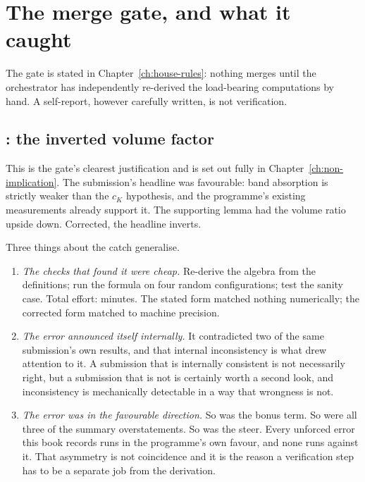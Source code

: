 \section{The merge gate, and what it caught}
\label{sec:gate-record}

The gate is stated in Chapter~\ref{ch:house-rules}: nothing merges until the
orchestrator has independently re-derived the load-bearing computations by
hand. A self-report, however carefully written, is not verification.

\subsection{\texorpdfstring{: the inverted volume factor}{S44: the inverted volume factor}}

This is the gate's clearest justification and is set out fully in
Chapter~\ref{ch:non-implication}. The submission's headline was favourable:
band absorption is strictly weaker than the \(c_K\) hypothesis, and the
programme's existing measurements already support it. The supporting lemma had
the volume ratio upside down. Corrected, the headline inverts.

Three things about the catch generalise.

\begin{enumerate}[leftmargin=2.2em]
\item \emph{The checks that found it were cheap.} Re-derive the algebra from
  the definitions; run the formula on four random configurations; test the
  sanity case. Total effort: minutes. The stated form matched nothing
  numerically; the corrected form matched to machine precision.
\item \emph{The error announced itself internally.} It contradicted two of the
  same submission's own results, and that internal inconsistency is what drew
  attention to it. A submission that is internally consistent is not
  necessarily right, but a submission that is not is certainly worth a second
  look, and inconsistency is mechanically detectable in a way that
  wrongness is not.
\item \emph{The error was in the favourable direction.} So was the 
  bonus term. So were all three of the  summary overstatements. So was
  the  steer. Every unforced error this book records runs in the
  programme's own favour, and none runs against it. That asymmetry is not
  coincidence and it is the reason a verification step has to be a separate
  job from the derivation.
\end{enumerate}

